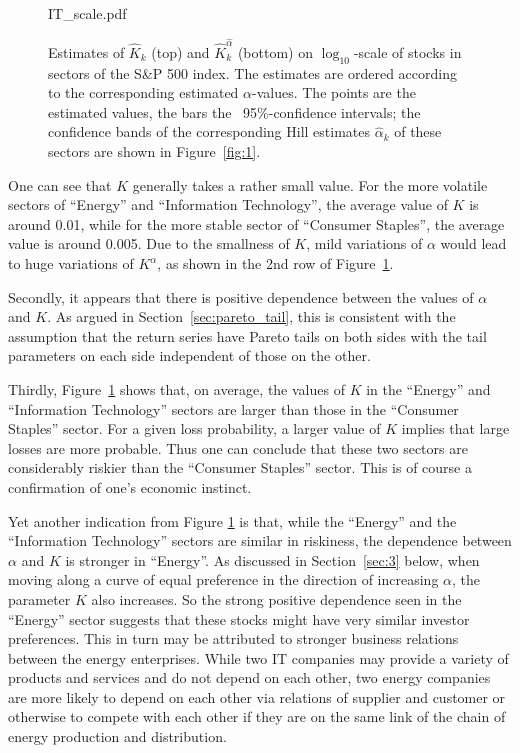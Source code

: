 \begin{figure}[htb!]
\begin{minipage}{0.33\linewidth}
    {IT_scale.pdf}
  \end{minipage}
  \caption{\small Estimates of $\hat K_k$ (top) and $\hat K_k^{\hat
      \alpha}$ (bottom) on $\log_{10}$-scale of stocks in sectors
    of the S\&P 500 index. The estimates are ordered according to the 
    corresponding estimated $\alpha$-values.
    The points are the estimated values, the bars 
    the \asy\ 95\%-confidence intervals; the confidence bands of the
    corresponding Hill estimates $\hat \alpha_k$ of these sectors are
    shown in Figure~\ref{fig:1}. 
  }
  \label{fig:sectors_parameters}
\end{figure}
One can see that $K$ generally takes a rather small value. For the
more volatile sectors of ``Energy'' and ``Information Technology'',
the average value of $K$ is around 0.01, while for the more stable
sector of ``Consumer Staples'', the average value is around 0.005. Due
to the smallness of $K$, mild variations of $\alpha$ would lead to
huge variations of $K^\alpha$, as shown in the 2nd row of
Figure~\ref{fig:sectors_parameters}.
\par
Secondly, it appears that there is positive dependence between the
values of $\alpha$ and $K$.
As argued in Section~\ref{sec:pareto_tail}, this is consistent with
the assumption that the return series have Pareto tails on both sides
with the tail parameters on each side independent of those on the
other.

\par
Thirdly, Figure~\ref{fig:sectors_parameters} shows that, on
average, the values of $K$
in the ``Energy'' and ``Information Technology'' sectors are  larger
than those in the ``Consumer Staples'' sector.  For a given loss
probability, a larger value of $K$ implies that large losses are more
probable. Thus one can conclude that these two sectors are
considerably riskier than the ``Consumer Staples'' sector. This is of
course a confirmation of one's economic instinct.

Yet another indication from Figure \ref{fig:sectors_parameters} is
that, while the ``Energy'' and the ``Information Technology'' sectors
are similar in riskiness, the dependence  between $\alpha$ and $K$ is
stronger in ``Energy''. As discussed in Section~\ref{sec:3} below, when moving along
a curve of equal preference in the direction of increasing $\alpha$, the parameter $K$ also
increases. So the strong positive dependence seen in the ``Energy''
sector suggests that these stocks might have very similar investor
preferences. This in turn may be attributed to stronger business
relations between the energy enterprises. While two IT companies
may provide a variety of products and services and do not depend on each
other, two energy companies are more likely to depend on each other
via relations of supplier and customer or otherwise to compete with each
other if they are on the same link of the chain of energy production
and distribution.

